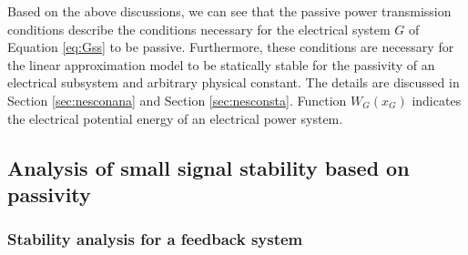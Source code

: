 \documentclass[graybox, envcountchap]{svmult}
\begin{document}
Based on the above discussions, we can see that the passive power transmission conditions describe the conditions necessary for the electrical system $G$ of Equation \ref{eq:Gss} to be passive.
Furthermore, these conditions are necessary for the linear approximation model to be statically stable for the passivity of an electrical subsystem and arbitrary physical constant.
The details are discussed in Section \ref{sec:nesconana} and Section \ref{sec:nesconsta}.
Function $W_G(x_G)$ indicates the electrical potential energy of an electrical power system.

\subsection{Analysis of small signal stability based on passivity\advanced}

\smallskip
\subsubsection{Stability analysis for a feedback system}
\end{document}
